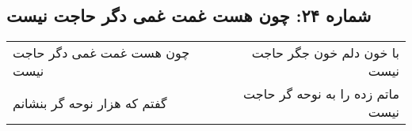 \begin{center}
\section*{شماره ۲۴: چون هست غمت غمی دگر حاجت نیست}
\label{sec:024}
\begin{longtable}{l p{0.5cm} r}
چون هست غمت غمی دگر حاجت نیست
&&
با خون دلم خون جگر حاجت نیست
\\
گفتم که هزار نوحه گر بنشانم
&&
ماتم زده را به نوحه گر حاجت نیست
\\
\end{longtable}
\end{center}
